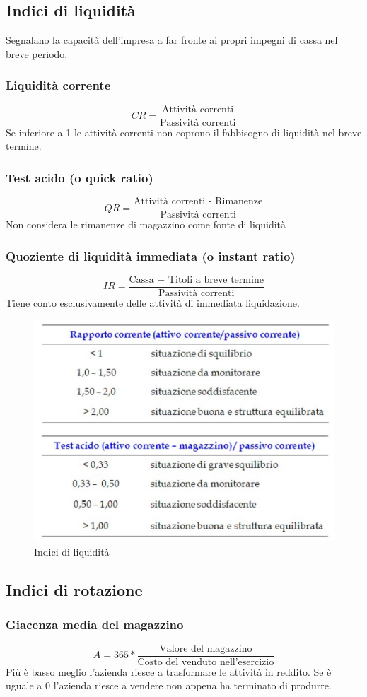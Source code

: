 \documentclass{report}
\begin{document}
	\subsection{Indici di liquidità}
	Segnalano la capacità dell'impresa a far fronte ai propri impegni di cassa nel breve periodo.
	\subsubsection{Liquidità corrente}
	\[CR = \frac{\text{Attività correnti}}{\text{Passività correnti}}\]
	Se inferiore a 1 le attività correnti non coprono il fabbisogno di liquidità nel breve termine.
	\subsubsection{Test acido (o quick ratio)}
	\[QR = \frac{\text{Attività correnti - Rimanenze}}{\text{Passività correnti}}\]
	Non considera le rimanenze di magazzino come fonte di liquidità
	\subsubsection{Quoziente di liquidità immediata (o instant ratio)}
	\[IR = \frac{\text{Cassa + Titoli a breve termine}}{\text{Passività correnti}}\]
	Tiene conto esclusivamente delle attività di immediata liquidazione.
	\begin{figure}[h]
		\centering
		\includegraphics[width=0.7\linewidth]{images/indici-liquidita}
		\caption{Indici di liquidità}
		\label{fig:indici-liquidita}
	\end{figure}
	\subsection{Indici di rotazione}
	\subsubsection{Giacenza media del magazzino}
	\[A = 365 * \frac{\text{Valore del magazzino}}{\text{Costo del venduto nell'esercizio}}\]
	Più è basso meglio l'azienda riesce a trasformare le attività in reddito. Se è uguale a 0 l'azienda riesce a vendere non appena ha terminato di produrre.
\end{document}

